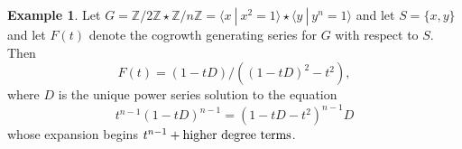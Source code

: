 \documentclass[11pt]{amsart}
\theoremstyle{definition}
\newtheorem{example}[theorem]{Example}
\begin{document}

\begin{example} \label{exam:3}
Let $G=\mathbb{Z}/2\mathbb{Z}\star \mathbb{Z}/n\mathbb{Z}=\langle x ~|~x^2=1\rangle \star \langle y ~|~y^n=1\rangle$ and let $S=\{x,y\}$ and let $F(t)$ denote the cogrowth generating series for $G$ with respect to $S$.  Then $$F(t)= (1-tD)/((1-tD)^2-t^2),$$ where $D$ is the unique power series solution to the equation
$$t^{n-1}(1-tD)^{n-1} = (1-tD-t^2)^{n-1} D$$ whose expansion begins $t^{n-1}+{\rm higher~degree~terms}$.
\end{example}
\end{document}
